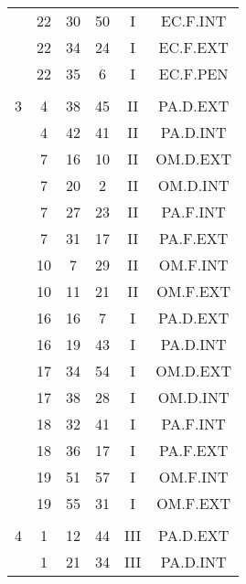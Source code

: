 \documentclass[12pt, a4paper]{article}
\begin{document}
\begin{multicols}{3}
{\begin{tabular}{c c c c c c}
	 	 	 	 & 22 & 30 & 50 & I & EC.F.INT\\%
	 	 	 	 & 22 & 34 & 24 & I & EC.F.EXT\\%
	 	 	 	 & 22 & 35 & 6 & I & EC.F.PEN\\%
	 	 	 	 & & & & & \\%
	 	 	 	3 & 4 & 38 & 45 & II & PA.D.EXT\\%
	 	 	 	 & 4 & 42 & 41 & II & PA.D.INT\\%
	 	 	 	 & 7 & 16 & 10 & II & OM.D.EXT\\%
	 	 	 	 & 7 & 20 & 2 & II & OM.D.INT\\%
	 	 	 	 & 7 & 27 & 23 & II & PA.F.INT\\%
	 	 	 	 & 7 & 31 & 17 & II & PA.F.EXT\\%
	 	 	 	 & 10 & 7 & 29 & II & OM.F.INT\\%
	 	 	 	 & 10 & 11 & 21 & II & OM.F.EXT\\%
	 	 	 	 & 16 & 16 & 7 & I & PA.D.EXT\\%
	 	 	 	 & 16 & 19 & 43 & I & PA.D.INT\\%
	 	 	 	 & 17 & 34 & 54 & I & OM.D.EXT\\%
	 	 	 	 & 17 & 38 & 28 & I & OM.D.INT\\%
	 	 	 	 & 18 & 32 & 41 & I & PA.F.INT\\%
	 	 	 	 & 18 & 36 & 17 & I & PA.F.EXT\\%
	 	 	 	 & 19 & 51 & 57 & I & OM.F.INT\\%
	 	 	 	 & 19 & 55 & 31 & I & OM.F.EXT\\%
	 	 	 	 & & & & & \\%
	 	 	 	4 & 1 & 12 & 44 & III & PA.D.EXT\\%
	 	 	 	 & 1 & 21 & 34 & III & PA.D.INT\\%

\end{tabular}}
\end{multicols}
\end{document}
